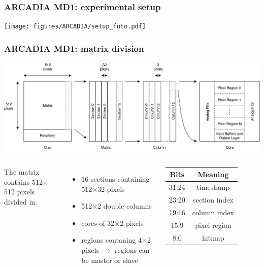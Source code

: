     \begin{frame}[noframenumbering]
        \frametitle{ARCADIA MD1: experimental setup}
            \texttt{[image: figures/ARCADIA/setup\_foto.pdf]}
    \end{frame}


    \begin{frame}[noframenumbering]
        \frametitle{ARCADIA MD1: matrix division}
            \includegraphics[width=1.\linewidth]{figures/ARCADIA/hierarchy.png}
            \begin{columns}
                    The matrix contains 512$\times$512 pixels divided in:
                    \begin{itemize}
                        \item 16 sections containing 512$\times$32 pixels
                        \item 512$\times$2 double columns
                        \item cores of 32$\times$2 pixels
                        \item regions contaning 4$\times$2 pixels $\rightarrow$ regions can be master or slave
                    \end{itemize}
                    \begin{table}
                        \begin{tabular}{|c |c |}
                        \hline
                        Bits & Meaning  \\
                        \hline
                        \hline
                        31:24 & timestamp\\
                        23:20 & section index\\
                        19:16 & column index\\
                        15:9 & pixel region\\
                        8:0 & hitmap\\
                        \hline
                        \end{tabular}
                    \end{table}
            \end{columns}
    \end{frame}


